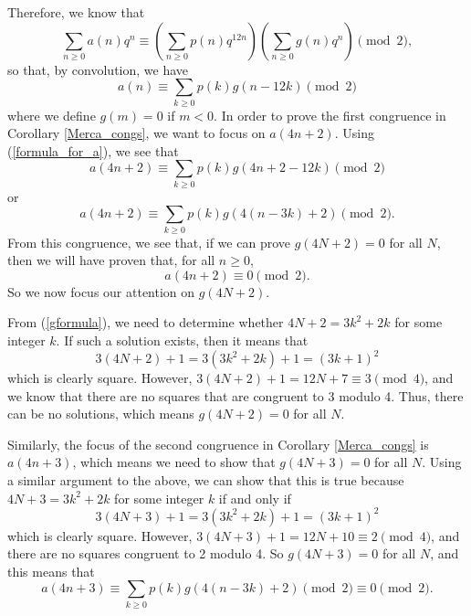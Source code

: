 \documentclass{amsart}
\begin{document}
Therefore, we know that  
$$
\sum_{n\geq 0} a(n)q^n \equiv \left(\sum_{n\geq 0}p(n)q^{12n}  \right)  \left( \sum_{n\geq 0}g(n)q^{n} \right) \pmod{2},
$$
so that, by convolution, we have 
\begin{equation}
\label{formula_for_a}
a(n) \equiv \sum_{k\geq 0} p(k)g(n - 12k) \pmod{2}
\end{equation}
where we define $g(m) = 0$ if $m<0$.  
In order to prove the first congruence in Corollary \ref{Merca_congs}, we want to focus on $a(4n+2)$.  Using (\ref{formula_for_a}), we see that 
$$a(4n+2) \equiv \sum_{k\geq 0} p(k)g(4n+2 - 12k) \pmod{2}$$
or 
$$a(4n+2) \equiv \sum_{k\geq 0} p(k)g(4(n-3k)+2) \pmod{2}.$$
From this congruence, we see that, if we can prove $g(4N+2) = 0$ for all $N$, then we will have proven that, for all $n\geq 0$, 
$$a(4n+2) \equiv 0 \pmod{2}.$$  So we now focus our attention on $g(4N+2)$.  

From (\ref{gformula}), we need to determine whether $4N+2 = 3k^2+2k$ for some integer $k$.  If such a solution exists, then it means that 
$$3(4N+2) + 1 = 3(3k^2+2k)+1 = (3k+1)^2$$ 
which is clearly square.  However, $3(4N+2)+1 = 12N+7 \equiv 3 \pmod{4}$, and we know that there are no squares that are congruent to 3 modulo 4.  Thus, there can be no solutions, which means $g(4N+2)=0$ for all $N$.  

Similarly, the focus of the second congruence in Corollary \ref{Merca_congs} is $a(4n+3)$, which means we need to show that $g(4N+3) = 0$ for all $N$.  Using a similar argument to the above, we can show that this is true because 
$4N+3 = 3k^2+2k$ for some integer $k$ if and only if 
$$3(4N+3) + 1 = 3(3k^2+2k)+1 = (3k+1)^2$$ 
which is clearly square.  However, $3(4N+3)+1 = 12N+10 \equiv 2 \pmod{4}$, and there are no squares congruent to 2 modulo 4.  So $g(4N+3)=0$ for all $N$, and this means that 
$$
a(4n+3) \equiv \sum_{k\geq 0} p(k)g(4(n-3k)+2) \pmod{2} \equiv 0 \pmod{2}.
$$


\end{document}
